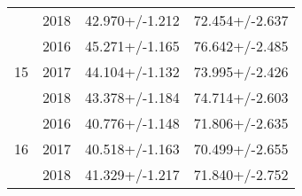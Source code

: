 \begin{table}
\begin{tabular}{cccc}
   & 2018 &       42.970+/-1.212 &        72.454+/-2.637 \\
\cline{1-4}
\multirow{3}{*}{15} & 2016 &       45.271+/-1.165 &        76.642+/-2.485 \\
   & 2017 &       44.104+/-1.132 &        73.995+/-2.426 \\
   & 2018 &       43.378+/-1.184 &        74.714+/-2.603 \\
\cline{1-4}
\multirow{3}{*}{16} & 2016 &       40.776+/-1.148 &        71.806+/-2.635 \\
   & 2017 &       40.518+/-1.163 &        70.499+/-2.655 \\
   & 2018 &       41.329+/-1.217 &        71.840+/-2.752 \\
\bottomrule
\end{tabular}
\end{table}
